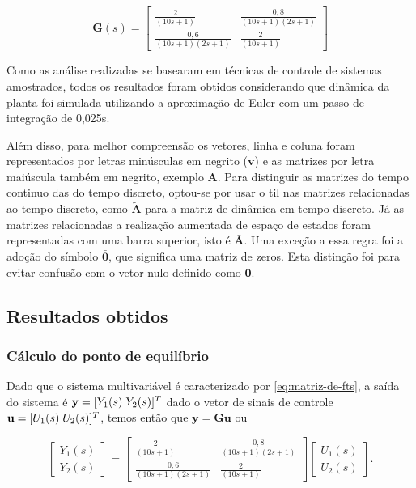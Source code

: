 \begin{equation}
    \label{eq:matriz-de-fts}
    \mathbf{G}(s) =
    \begin{bmatrix}
        \frac{2}{(10s+1)}         & \frac{0,8}{(10s+1)(2s+1)} \\
        \frac{0,6}{(10s+1)(2s+1)} & \frac{2}{(10s+1)}
    \end{bmatrix}
\end{equation}

Como as análise realizadas se basearam em técnicas de controle de sistemas
amostrados, todos os resultados foram obtidos considerando que dinâmica da
planta foi simulada utilizando a aproximação de Euler com um passo de integração
de 0,025s.

Além disso, para melhor compreensão os vetores, linha e coluna foram
representados por letras minúsculas em negrito ($\mathbf{v}$) e as
matrizes por letra maiúscula também em negrito, exemplo $\mathbf{A}$. Para
distinguir as matrizes do tempo continuo das do tempo discreto, optou-se por
usar o til nas matrizes relacionadas ao tempo discreto, como
$\mathbf{\tilde{A}}$ para a matriz de dinâmica em tempo discreto. Já as matrizes
relacionadas a realização aumentada de espaço de estados foram representadas com
uma barra superior, isto é $\mathbf{\bar{A}}$. Uma exceção a essa regra foi a
adoção do símbolo $\mathbf{\bar{0}}$, que significa uma matriz de zeros. Esta
distinção foi para evitar confusão com o vetor nulo definido como $\mathbf{0}$.

\subsection{Resultados obtidos}
\label{sub:resultados-obtidos-desafio6}

\subsubsection{Cálculo do ponto de equilíbrio}
\label{subsub:calculo-do-ponto-de-equilibrio}
Dado que o sistema multivariável é caracterizado por \ref{eq:matriz-de-fts}, a
saída do sistema é $\mathbf{y} = [Y_1(s) \thickspace Y_2(s)]^{T}$ dado o vetor de
sinais de controle $\mathbf{u} = [U_1(s) \thickspace U_2(s)]^{T}$, temos então que
$\mathbf{y} = \mathbf{G}\mathbf{u}$ ou

\begin{equation}
    \label{eq:relacao-entrada-saida-de-g}
    \begin{bmatrix}
        Y_1(s) \\
        Y_2(s)
    \end{bmatrix}
    =
    \begin{bmatrix}
        \frac{2}{(10s+1)}         & \frac{0,8}{(10s+1)(2s+1)} \\
        \frac{0,6}{(10s+1)(2s+1)} & \frac{2}{(10s+1)}
    \end{bmatrix}
    \begin{bmatrix}
        U_1(s) \\
        U_2(s)
    \end{bmatrix}.
\end{equation}

